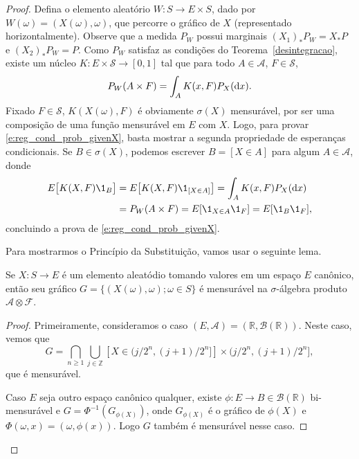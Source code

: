 \begin{proof}
  Defina o elemento aleatório $W: S \to E \times S$, dado por $W(\omega) = (X(\omega), \omega)$, que percorre o gráfico de $X$ (representado horizontalmente).
  Observe que a medida $P_W$ possui marginais $(X_1)_* P_W = X_* P$ e $(X_2)_* P_W = P$.
  Como $P_W$ satisfaz as condições do Teorema~\ref{desintegracao}, existe um núcleo $K: E \times \mathcal{S} \to [0,1]$ tal que para todo $A \in \mathcal{A}$, $F \in \mathcal{S}$,
  \begin{equation}
    P_W(A \times F) = \int_A K(x, F) P_X (\mathop{}\!\mathrm{d} x).
  \end{equation}
  Fixado $F \in \mathcal{S}$, $K(X(\omega), F)$ é obviamente $\sigma(X)$ mensurável, por ser uma composição de uma função mensurável em $E$ com $X$.
  Logo, para provar \eqref{e:reg_cond_prob_givenX}, basta mostrar a segunda propriedade de esperanças condicionais.
  Se $B \in \sigma(X)$, podemos escrever $B = [X \in A]$ para algum $A \in \mathcal{A}$, donde
  \begin{equation}
    \begin{split}
      E\big[ K(X, F) \1_B \big] & = E\big[ K(X, F) \1_{[X \in A]} \big] = \int_A K(x, F) P_X(\d x)\\
      & = P_W (A \times F) = E[\1_{X \in A} \1_F] = E[\1_B \1_F],
    \end{split}
  \end{equation}
  concluindo a prova de \eqref{e:reg_cond_prob_givenX}.

  Para mostrarmos o Princípio da Substituição, vamos usar o seguinte lema.

  \begin{lemma}
    Se $X : S \to E$ é um elemento aleatódio tomando valores em um espaço $E$ canônico, então seu gráfico $G = \{(X(\omega), \omega); \omega \in S\}$ é mensurável na $\sigma$-álgebra produto $\mathcal{A} \otimes \mathcal{F}$.
  \end{lemma}

  \begin{proof}
    Primeiramente, consideramos o caso $(E, \mathcal{A}) = (\mathbb{R}, \mathcal{B}(\mathbb{R}))$.
    Neste caso, vemos que
    \begin{equation}
      G = \bigcap_{n \geq 1} \bigcup_{j \in \mathbb{Z}} [X \in \big(j/2^n, (j+1)/2^n \big]] \times \big( j/2^n, (j+1)/2^n \big],
    \end{equation}
    que é mensurável.

    Caso $E$ seja outro espaço canônico qualquer, existe $\phi: E \to B \in \mathcal{B}(\mathbb{R})$ bi-mensurável e $G = \Phi^{-1}(G_{\phi(X)})$, onde
    $G_{\phi(X)}$ é o gráfico de $\phi(X)$ e $\Phi(\omega, x) = (\omega, \phi(x))$.
    Logo $G$ também é mensurável nesse caso.
  \end{proof}


\end{proof}

